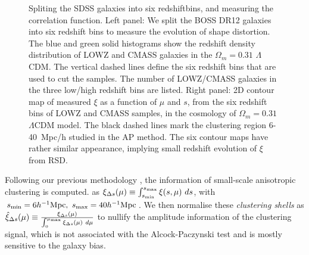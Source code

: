 \documentclass[prl,twocolumn,superscriptaddress,aps,amsmath,amssymb,nofootinbib,altaffilletter]{revtex4}
\begin{document}
\begin{figure}
   \caption{\label{fig_TpCF}
   Spliting the SDSS galaxies into six redshiftbins, and measuring the correlation function.
   Left panel: We split the BOSS DR12 galaxies into six redshift bins to measure the evolution of shape distortion.
   The blue and green solid histograms show the redshift density distribution of LOWZ and CMASS galaxies in the $\Omega_m=0.31$ $\Lambda$CDM. 
   The vertical dashed lines define the six redshift bins that are used to cut the samples.
   The number of LOWZ/CMASS galaxies in the three low/high redshift bins are listed.
   Right panel: 2D contour map of measured $\xi$ as a function of $\mu$ and $s$, from the six redshift bins of LOWZ and CMASS samples, 
      in the cosmology of $\Omega_m=0.31$ $\Lambda$CDM model.
    The black dashed lines mark the clustering region 6-40\ Mpc/h studied in the AP method.
    The six contour maps have rather similar appearance, implying small redshift evolution of $\xi$ from RSD.
   }
\end{figure}

Following our previous methodology \citep{Li2016}, the information of small-scale anisotropic clustering is computed.
as $\xi_{\Delta s} (\mu) \equiv \int_{s_{\rm min}}^{s_{\rm max}} \xi (s,\mu)\ ds$, 
with $s_{\rm min}=6 h^{-1} {\rm Mpc},\ s_{\rm max}=40 h^{-1} {\rm Mpc}$.
We then normalise these {\em clustering shells} as 
$\hat\xi_{\Delta s}(\mu) \equiv \frac{\xi_{\Delta s}(\mu)}{\int_{0}^{\mu_{\rm max}}\xi_{\Delta s}(\mu)\ d\mu}$
to nullify the amplitude information of the clustering signal, 
which is not associated with the Alcock-Paczynski test and is mostly sensitive to the galaxy bias.
\end{document}
